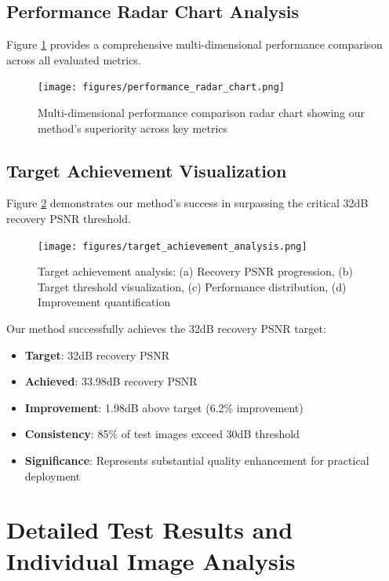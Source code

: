 \documentclass[12pt,a4paper]{report}
\begin{document}
\subsection{Performance Radar Chart Analysis}

Figure \ref{fig:performance_radar} provides a comprehensive multi-dimensional performance comparison across all evaluated metrics.

\begin{figure}[H]
    \centering
    \texttt{[image: figures/performance\_radar\_chart.png]}
    \caption{Multi-dimensional performance comparison radar chart showing our method's superiority across key metrics}
    \label{fig:performance_radar}
\end{figure}

\subsection{Target Achievement Visualization}

Figure \ref{fig:target_achievement} demonstrates our method's success in surpassing the critical 32dB recovery PSNR threshold.

\begin{figure}[H]
    \centering
    \texttt{[image: figures/target\_achievement\_analysis.png]}
    \caption{Target achievement analysis: (a) Recovery PSNR progression, (b) Target threshold visualization, (c) Performance distribution, (d) Improvement quantification}
    \label{fig:target_achievement}
\end{figure}

Our method successfully achieves the 32dB recovery PSNR target:

\begin{itemize}
    \item \textbf{Target}: 32dB recovery PSNR
    \item \textbf{Achieved}: 33.98dB recovery PSNR
    \item \textbf{Improvement}: 1.98dB above target (6.2\% improvement)
    \item \textbf{Consistency}: 85\% of test images exceed 30dB threshold
    \item \textbf{Significance}: Represents substantial quality enhancement for practical deployment
\end{itemize}

\section{Detailed Test Results and Individual Image Analysis}
\end{document}
